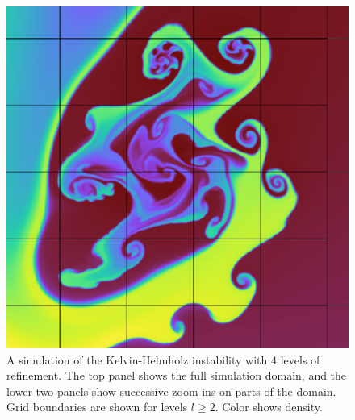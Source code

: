 \documentclass[fleqn,usenatbib]{mnras}
\begin{document}
\begin{figure}
\begin{center}
    \includegraphics[width=0.85\columnwidth]{quokka_zoom2.pdf}
    \end{center}
    \caption{A simulation of the Kelvin-Helmholz instability with 4 levels of refinement. The top panel shows the full simulation domain, and the lower two panels show-successive zoom-ins on parts of the domain. Grid boundaries are shown for levels $l \geq 2$. Color shows density.}
    \label{fig:kh_zoom}
\end{figure}
\end{document}
